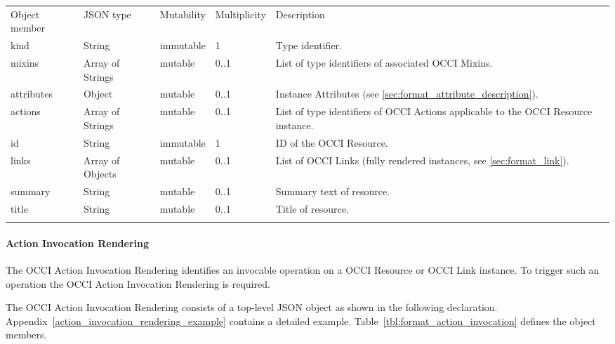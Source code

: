 \documentclass[10pt,a4paper]{article}
\begin{document}
 {
    \begin{tabularx}{\textwidth}{llllX}
    \toprule
    Object member & JSON type         & Mutability  & Multiplicity  & Description  \\
    \colrule
    kind          & String            & immutable   & 1             & Type identifier. \\

    mixins        & Array of Strings  & mutable     & 0..1          & List of type identifiers of associated OCCI Mixins.  \\

    attributes    & Object            & mutable     & 0..1          & Instance Attributes (see \ref{sec:format_attribute_description}). \\

    actions       & Array of Strings  & mutable     & 0..1          & List of type identifiers of OCCI Actions applicable to the OCCI Resource instance. \\

    id            & String            & immutable   & 1             & ID of the OCCI Resource. \\

    links         & Array of Objects  & mutable     & 0..1          & List of OCCI Links (fully rendered instances, see \ref{sec:format_link}). \\

    summary       & String            & mutable     & 0..1          & Summary text of resource. \\

    title         & String            & mutable     & 0..1          & Title of resource. \\
    \botrule
    \end{tabularx}
}

\paragraph{Action Invocation Rendering}
\label{sec:format_action_invocation}

The OCCI Action Invocation Rendering identifies an invocable operation on a OCCI Resource or
OCCI Link instance. To trigger such an operation the OCCI Action Invocation
Rendering is required.

The OCCI Action Invocation Rendering consists of a top-level JSON object as shown in the
following declaration. Appendix~\ref{action_invocation_rendering_example} contains a detailed example.
Table~\ref{tbl:format_action_invocation} defines the object members.
\end{document}
